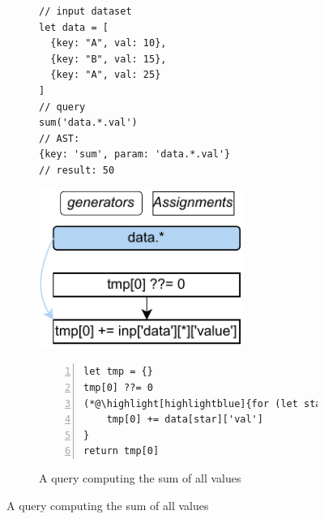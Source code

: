 \documentclass[runningheads]{llncs}
\begin{document}
\begin{figure}[t!]
\begin{subfigure}{\textwidth}
\begin{minipage}{0.33\textwidth}
\begin{lstlisting}[style=JavaScriptTiny, columns=flexible]
// input dataset
let data = [
  {key: "A", val: 10},
  {key: "B", val: 15},
  {key: "A", val: 25}
]
// query
sum('data.*.val')
// AST:
{key: 'sum', param: 'data.*.val'}
// result: 50
\end{lstlisting}
\end{minipage}
\begin{minipage}{0.27\textwidth}
\centering
\includegraphics[width=0.73\textwidth]{images/intro_q1_ir.pdf}
\end{minipage}
\begin{minipage}{0.4\textwidth}
\begin{lstlisting}[style=JavaScriptTiny, columns=flexible, numbers=left, xleftmargin=2pt]
let tmp = {}
tmp[0] ??= 0
(*@\highlight[highlightblue]{for (let star in data) }@*) {
    tmp[0] += data[star]['val']
}
return tmp[0]
\end{lstlisting}
\end{minipage}
\caption{A query computing the sum of all values}\label{fig:intro_q1}
\end{subfigure}


\end{figure}
\end{document}
